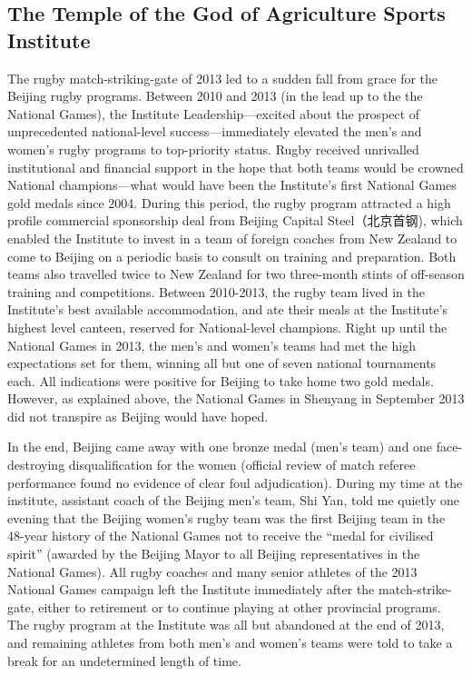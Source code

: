 \begin{CJK}{UTF8}{gbsn}
\subsection{The Temple of the God of Agriculture Sports Institute}
The rugby match-striking-gate of 2013 led to a sudden fall from grace for the Beijing rugby programs.  Between 2010 and 2013 (in the lead up to the the National Games), the Institute Leadership---excited about the prospect of unprecedented national-level success---immediately elevated the men's and women's rugby programs to top-priority status.  Rugby received unrivalled institutional and financial support in the hope that both teams would be crowned National champions---what would have been the Institute's first National Games gold medals since 2004.  During this period, the rugby program attracted a high profile commercial sponsorship deal from Beijing Capital Steel（北京首钢), which enabled the Institute to invest in a team of foreign coaches from New Zealand to come to Beijing on a periodic basis to consult on training and preparation. Both teams also travelled twice to New Zealand for two three-month stints of off-season training and competitions.  Between 2010-2013, the rugby team lived in the Institute's best available accommodation, and ate their meals at the Institute's highest level canteen, reserved for National-level champions.  Right up until the National Games in 2013, the men's and women's teams had met the high expectations set for them, winning all but one of seven national tournaments each.  All indications were positive for Beijing to take home two gold medals.  However, as explained above, the National Games in Shenyang in September 2013 did not transpire as Beijing would have hoped.

In the end, Beijing came away with one bronze medal (men's team) and one face-destroying disqualification for the women (official review of match referee performance found no evidence of clear foul adjudication).  During my time at the institute, assistant coach of the Beijing men's team, Shi Yan, told me quietly one evening that the Beijing women's rugby team was the first Beijing team in the 48-year history of the National Games not to receive the ``medal for civilised spirit''  (awarded by the Beijing Mayor to all Beijing representatives in the National Games).  All rugby coaches and many senior athletes of the 2013 National Games campaign left the Institute immediately after the match-strike-gate, either to retirement or to continue playing at other provincial programs.  The rugby program at the Institute was all but abandoned at the end of 2013, and remaining athletes from both men's and women's teams were told to take a break for an undetermined length of time.


\end{CJK}

